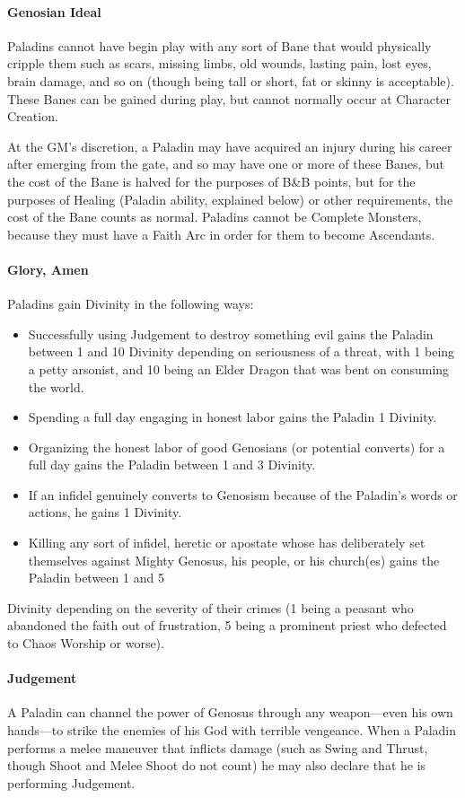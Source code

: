 \documentclass[oneside,11pt,english]{book}
\begin{document}
\paragraph{Genosian Ideal}
Paladins cannot have begin play with any sort of Bane that would physically cripple them such as 
scars, missing limbs, old wounds, lasting pain, lost eyes, brain damage, and so on (though being 
tall or short, fat or skinny is acceptable). These Banes can be gained during play, but cannot 
normally occur at Character Creation. 

At the GM's discretion, a Paladin may have acquired an 
injury during his career after emerging from the gate, and so may have one or more of these
Banes, but the cost of the Bane is halved for the purposes of B\&B points, but for the purposes of
Healing (Paladin ability, explained below) or other requirements, the cost of the Bane counts as normal.
Paladins cannot be Complete Monsters, because they must have a Faith Arc in order for them to become Ascendants. 
\paragraph{Glory, Amen}
Paladins gain Divinity in the following ways:
\begin{itemize}
\item Successfully using Judgement to destroy something evil gains the Paladin between 1 and 
10 Divinity depending on seriousness of a threat, with 1 being a petty arsonist, and 10 
being an Elder Dragon that was bent on consuming the world. 
\item Spending a full day engaging in honest labor gains the Paladin 1 Divinity. 
\item Organizing the honest labor of good Genosians (or potential converts) for a full day gains 
the Paladin between 1 and 3 Divinity. 
\item If an infidel genuinely converts to Genosism because of the Paladin's words or actions, he 
gains 1 Divinity. 
\item Killing any sort of infidel, heretic or apostate whose has deliberately set themselves 
against Mighty Genosus, his people, or his church(es) gains the Paladin between 1 and 5 
\end{itemize}
Divinity depending on the severity of their crimes (1 being a peasant who abandoned the faith out of frustration, 5 being a prominent priest who defected to Chaos Worship or worse).
\paragraph{Judgement}
A Paladin can channel the power of Genosus through any weapon—even his own hands—to strike the enemies of his God with terrible vengeance. When a Paladin performs a melee maneuver that inflicts damage (such as Swing and Thrust, though Shoot and Melee Shoot do not count) he may also declare that he is performing Judgement.\par
\end{document}
